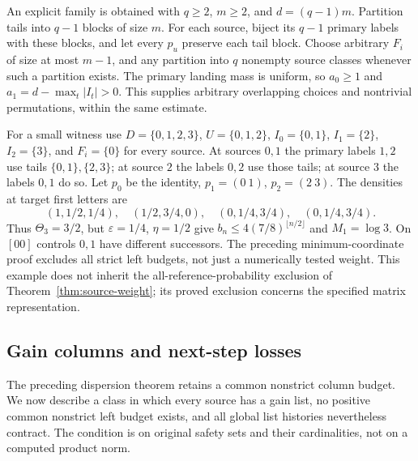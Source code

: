 \documentclass[11pt,reqno]{amsart}
\numberwithin{equation}{section}
\theoremstyle{definition}
\theoremstyle{definition}
\newcommand{\eps}{\varepsilon}
\begin{document}
An explicit family is obtained with $q\ge2$, $m\ge2$, and
$d=(q-1)m$. Partition tails into $q-1$ blocks of size $m$.
For each source, biject its $q-1$ primary labels with these blocks,
and let every $p_u$ preserve each tail block. Choose arbitrary
$F_i$ of size at most $m-1$, and any partition into $q$ nonempty
source classes whenever such a partition exists. The primary
landing mass is uniform, so $a_0\ge1$ and
$a_1=d-\max_t|I_t|>0$. This supplies arbitrary overlapping
choices and nontrivial permutations, within the same estimate.

For a small witness use $D=\{0,1,2,3\}$, $U=\{0,1,2\}$,
$I_0=\{0,1\}$, $I_1=\{2\}$, $I_2=\{3\}$, and
$F_i=\{0\}$ for every source. At sources $0,1$ the primary
labels $1,2$ use tails $\{0,1\},\{2,3\}$; at source $2$ the
labels $0,2$ use those tails; at source $3$ the labels $0,1$ do so.
Let $p_0$ be the identity, $p_1=(0\ 1)$, $p_2=(2\ 3)$.
The densities at target first letters are
\[
 (1,1/2,1/4),\quad(1/2,3/4,0),\quad
 (0,1/4,3/4),\quad(0,1/4,3/4).
\]
Thus $\Theta_3=3/2$, but $\eps=1/4$, $\eta=1/2$ give
$b_n\le4(7/8)^{\lfloor n/2\rfloor}$ and $M_1=\log3$.
On $[00]$ controls $0,1$ have different successors. The preceding
minimum-coordinate proof excludes all strict left budgets, not
just a numerically tested weight. This example does not inherit
the all-reference-probability exclusion of
Theorem~\ref{thm:source-weight}; its proved exclusion concerns
the specified matrix representation.


\subsection{Gain columns and next-step losses}\label{sec:gainloss}

The preceding dispersion theorem retains a common nonstrict column
budget. We now describe a class in which every source has a gain
list, no positive common nonstrict left budget exists, and all global
list histories nevertheless contract. The condition is on original
safety sets and their cardinalities, not on a computed product norm.
\end{document}
